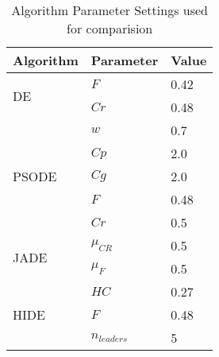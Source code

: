 

\begin{table}[b]
\centering
\caption{Algorithm Parameter Settings used for comparision}
\label{}
\begin{tabular}{|l|l|l|}
\hline
Algorithm & Parameter & Value \\
\hline
\multirow{2}{*}{DE} & $F$ & 0.42 \\ \cline{2-3} 
                  & $Cr$ & 0.48 \\ \hline
\multirow{5}{*}{PSODE} & $w$ & 0.7 \\ \cline{2-3} 
                  & $Cp$ & 2.0 \\ \cline{2-3} 
                  & $Cg$ & 2.0 \\ \cline{2-3} 
                  & $F$ & 0.48 \\ \cline{2-3} 
                  & $Cr$ & 0.5 \\ \hline
\multirow{2}{*}{JADE} & $\mu_{CR}$ & 0.5 \\ \cline{2-3} 
                  & $\mu_{F}$ & 0.5 \\ \hline
\multirow{3}{*}{HIDE} & $HC$ & 0.27 \\ \cline{2-3}
				& $F$ & 0.48 \\ \cline{2-3}
                  & $n_{leaders}$ & 5 \\ \hline
\end{tabular}
\end{table}